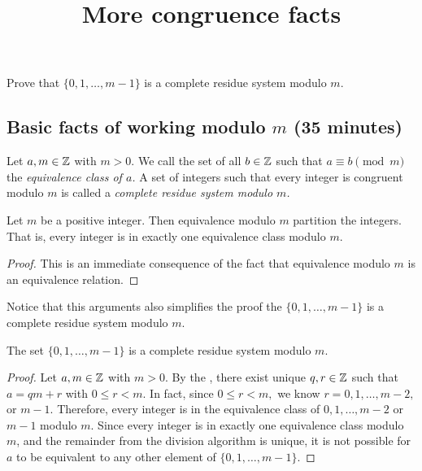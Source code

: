 \documentclass{../ximera}
\title{More congruence facts}
\begin{document}
\begin{abstract}
\end{abstract}
\maketitle


\begin{obj}
 \item Prove that $\{0,1,\dots,m-1\}$ is a complete residue system modulo $m$.
\end{obj}

\subsection{Basic facts of working modulo $m$ (35 minutes)}

\begin{defn}\label{defn:complete-residue}
 Let $a,m\in\mathbb Z$ with $m>0$. We call the set of all $b\in\mathbb Z$ such that $a\equiv b \pmod{m}$ the \emph{equivalence class of $a$.} A set of integers such that every integer is congruent modulo $m$ is called a \emph{complete residue system modulo $m$.}
\end{defn}

\begin{prop*}\label{cor:mod-partition}
 Let $m$ be a positive integer. Then equivalence modulo $m$ partition the integers. That is, every integer is in exactly one equivalence class modulo $m$.
\end{prop*}
\begin{proof}
This is an immediate consequence of the fact that equivalence modulo $m$ is an equivalence relation.
\end{proof}
 
 Notice that this arguments also simplifies the proof the $\{0,1,\dots,m-1\}$ is a complete residue system modulo $m$.
\begin{prop*}[Proposition 2.3]\label{prop:complete-residue}
The set $\{0,1,\dots,m-1\}$ is a complete residue system modulo $m$.
\end{prop*}
\begin{proof}
Let $a,m\in\mathbb Z$ with $m>0$. By the , there exist unique $q,r\in\mathbb Z$ such that $a=qm+r$ with $0\leq r <m$. In fact, since $0\leq r<m,$ we know $r=0,1,\dots, m-2,$ or $m-1$. Therefore, every integer is in the equivalence class of $0,1,\dots, m-2$ or $m-1$ modulo $m$.
Since every integer is in exactly one equivalence class modulo $m$, and the remainder from the division algorithm is unique, it is not possible for $a$ to be equivalent to any other element of $\{0,1,\dots,m-1\}$. 
\end{proof}
\end{document}
